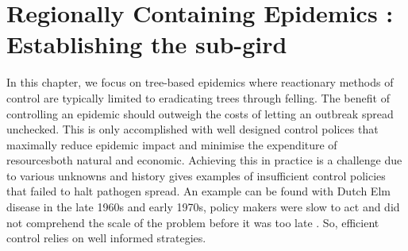 \chapter{Regionally Containing Epidemics : Establishing the sub-gird}
\label{chapter:regional-containment1}

In this chapter, we focus on tree-based epidemics where reactionary methods of control are typically limited to eradicating trees through felling. The benefit of controlling an epidemic should outweigh the costs of letting an outbreak spread unchecked. This is only accomplished with well designed control polices that maximally reduce epidemic impact and minimise the expenditure of resources\textemdash both natural and economic. Achieving this in practice is a challenge due to various unknowns \cite{13-challenges} and history gives examples of insufficient control policies that failed to halt pathogen spread. An example can be found with Dutch Elm disease in the late 1960s and early 1970s, policy makers were slow to act and did not comprehend the scale of the problem before it was too late \cite{dutch-elm-mismanage}. So, efficient control relies on well informed strategies.\\


